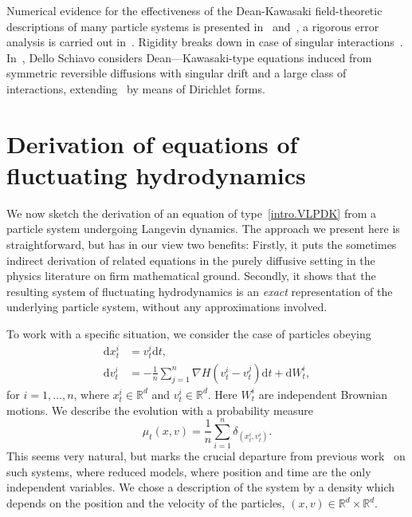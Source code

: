 \documentclass{article}
\newcommand{\dd}{\text{d}}
\newcommand{\R}{\mathbb{R}}
\begin{document}
Numerical evidence for the effectiveness of the Dean-Kawasaki field-theoretic descriptions of many particle
systems is presented in~\cite{Cornalba2023bTR} and~\cite{Wehlitz2024aTR}, a rigorous error analysis is carried
out in~\cite{Cornalba2023a,Cornalba2023b,Cornalba2023bTR}. Rigidity breaks down in case of singular
interactions~\cite{Andres2010a,Renesse2009a}. In~\cite{Dello-Schiavo2024aTR}, Dello Schiavo considers
Dean—Kawasaki-type equations induced from symmetric reversible diffusions with singular drift and a large
class of interactions, extending~\cite{Dello-Schiavo2022a} by means of Dirichlet forms.


\section{Derivation of equations of fluctuating hydrodynamics}
\label{sec:deriv-equat-fluct}

We now sketch the derivation of an equation of type~\eqref{intro.VLPDK} from a particle system undergoing
Langevin dynamics. The approach we present here is straightforward, but has in our view two benefits: Firstly,
it puts the sometimes indirect derivation of related equations in the purely diffusive setting in the physics
literature on firm mathematical ground.  Secondly, it shows that the resulting system of fluctuating
hydrodynamics is an \emph{exact} representation of the underlying particle system, without any approximations
involved.

To work with a specific situation, we consider the case of particles obeying
\begin{align}
  \dd x_t^i &= v_t^i\dd t, \label{deriv-a}\\
  \dd v_t^i &= -\frac 1 n \sum_{j=1}^n \nabla H(v_t^i - v_t^j) \dd t + \dd W_t^i, \label{deriv-b}
\end{align}
for $i = 1, \ldots, n$, where $x_t^i \in \R^d$ and $v_t^i \in \R^d$. Here $W_t^i$ are independent Brownian
motions.  We describe the evolution with a probability measure
\begin{equation}
  \label{deriv-delta}
  \mu_t(x,v) = \frac 1 n \sum_{i=1}^n \delta_{(x_t^i, v_t^i)}.
\end{equation}
This seems very natural, but marks the crucial departure from previous
work~\cite{Cornalba2021a,Cornalba2019a,Cornalba2020a} on such systems, where reduced models, where position
and time are the only independent variables. We chose a description of the system by a density which depends
on the position and the velocity of the particles, $(x,v)\in \R^d\times \R^d$.
\end{document}
